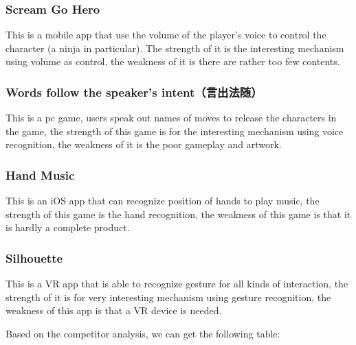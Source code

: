 \documentclass[UTF8,a4paper,12pt]{ctexart}
\numberwithin{equation}{section}
\begin{document}
\subsubsection*{Scream Go Hero}
This is a mobile app that use the volume of the player's voice to control the character (a ninja in particular). The strength of it is the interesting mechanism using volume as control, the weakness of it is there are rather too few contents.

\subsubsection*{Words follow the speaker's intent（言出法随）}
This is a pc game, users speak out names of moves to release the characters in the game, the strength of this game is for the interesting mechanism using voice recognition, the weakness of it is the poor gameplay and artwork.

\subsubsection*{Hand Music}
This is an iOS app that can recognize position of hands to play music, the strength of this game is the hand recognition, the weakness of this game is that it is hardly a complete product.

\subsubsection*{Silhouette}
This is a VR app that is able to recognize gesture for all kinds of interaction, the strength of it is for very interesting mechanism using gesture recognition, the weakness of this app is that a VR device is needed.

Based on the competitor analysis, we can get the following table:
\end{document}
